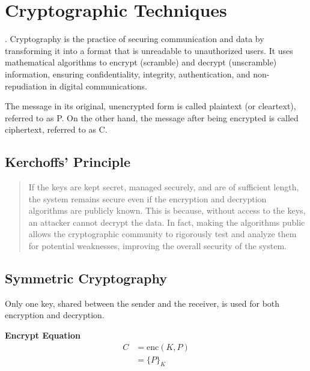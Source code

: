 \chapter{Cryptographic Techniques}
\cite{02_basic_crypto}.
Cryptography is the practice of securing communication and data by transforming it into a format that is unreadable to unauthorized users. It uses mathematical algorithms to encrypt (scramble) and decrypt (unscramble) information, ensuring confidentiality, integrity, authentication, and non-repudiation in digital communications.

The message in its original, unencrypted form is called plaintext (or cleartext), referred to as P. On the other hand, the message after being encrypted is called ciphertext, referred to as C. 

\section{Kerchoffs' Principle}
\begin{quotation}
    If the keys are kept secret, managed securely, and are of sufficient length, the system remains secure even if the encryption and decryption algorithms are publicly known. This is because, without access to the keys, an attacker cannot decrypt the data. In fact, making the algorithms public allows the cryptographic community to rigorously test and analyze them for potential weaknesses, improving the overall security of the system.
\end{quotation}

\section{Symmetric Cryptography}
\begin{center}
    Only one key, shared between the sender and the receiver, is used for both encryption and decryption. 
\end{center}

\textbf{Encrypt Equation}
\begin{equation*}
    \begin{aligned}
        C &= \text{enc}(K, P) \\
          &= \{ P \}_K
    \end{aligned}
\end{equation*}

\hfill

